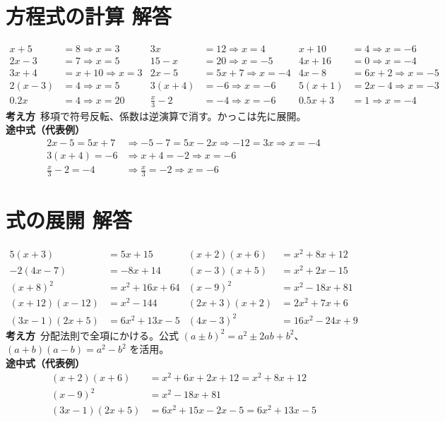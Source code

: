 \documentclass[paper=b4j,landscape,twocolumn,fleqn]{jlreq}
\begin{document}
\section{方程式の計算 解答}
\begin{align*}
x+5&=8\Rightarrow x=3 & 3x&=12\Rightarrow x=4 & x+10&=4\Rightarrow x=-6\\
2x-3&=7\Rightarrow x=5 & 15-x&=20\Rightarrow x=-5 & 4x+16&=0\Rightarrow x=-4\\
3x+4&=x+10\Rightarrow x=3 & 2x-5&=5x+7\Rightarrow x=-4 & 4x-8&=6x+2\Rightarrow x=-5\\
2(x-3)&=4\Rightarrow x=5 & 3(x+4)&=-6\Rightarrow x=-6 & 5(x+1)&=2x-4\Rightarrow x=-3\\
0.2x&=4\Rightarrow x=20 & \frac{x}{3}-2&=-4\Rightarrow x=-6 & 0.5x+3&=1\Rightarrow x=-4
\end{align*}
\textbf{考え方}\
移項で符号反転、係数は逆演算で消す。かっこは先に展開。\\
\textbf{途中式（代表例）}
\begin{align*}
2x-5=5x+7&\Rightarrow -5-7=5x-2x\Rightarrow -12=3x\Rightarrow x=-4\\
3(x+4)=-6&\Rightarrow x+4=-2\Rightarrow x=-6\\
\frac{x}{3}-2=-4&\Rightarrow \frac{x}{3}=-2\Rightarrow x=-6
\end{align*}

\newpage
\section{式の展開 解答}
\begin{align*}
5(x+3)&=5x+15 & (x+2)(x+6)&=x^2+8x+12\\
-2(4x-7)&=-8x+14 & (x-3)(x+5)&=x^2+2x-15\\
(x+8)^2&=x^2+16x+64 & (x-9)^2&=x^2-18x+81\\
(x+12)(x-12)&=x^2-144 & (2x+3)(x+2)&=2x^2+7x+6\\
(3x-1)(2x+5)&=6x^2+13x-5 & (4x-3)^2&=16x^2-24x+9
\end{align*}
\textbf{考え方}\
分配法則で全項にかける。公式 $(a\pm b)^2=a^2\pm2ab+b^2$、$(a+b)(a-b)=a^2-b^2$ を活用。\\
\textbf{途中式（代表例）}
\begin{align*}
(x+2)(x+6)&=x^2+6x+2x+12=x^2+8x+12\\
(x-9)^2&=x^2-18x+81\\
(3x-1)(2x+5)&=6x^2+15x-2x-5=6x^2+13x-5
\end{align*}
\end{document}
